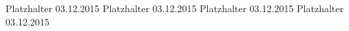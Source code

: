 \renewcommand{\ldate}{2015-12-03}

Platzhalter 03.12.2015
\newpage
Platzhalter 03.12.2015
\newpage
Platzhalter 03.12.2015
\newpage
Platzhalter 03.12.2015


